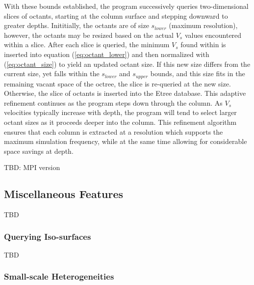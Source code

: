 With these bounds established, the program successively queries two-dimensional slices of octants, starting at the column surface and stepping downward to greater depths. Inititially, the octants are of size $s_{lower}$ (maximum resolution), however, the octants may be resized based on the actual $V_s$ values encountered within a slice. After each slice is queried, the minimum $V_s$ found within is inserted into equation (\ref{eq:octant_lower}) and then normalized with (\ref{eq:octant_size}) to yield an updated octant size. If this new size differs from the current size, yet falls within the $s_{lower}$ and $s_{upper}$ bounds, and this size fits in the remaining vacant space of the octree, the slice is re-queried at the new size. Otherwise, the slice of octants is inserted into the Etree database.
This adaptive refinement continues as the program steps down through the column. As $V_s$ velocities typically increase with depth, the program will tend to select larger octant sizes as it proceeds deeper into the column. This refinement algorithm ensures that each column is extracted at a resolution which supports the maximum simulation frequency, while at the same time allowing for considerable space savings at depth.

TBD: MPI version

\subsection{Miscellaneous Features}

TBD

\subsubsection{Querying Iso-surfaces}

TBD 


\subsubsection{Small-scale Heterogeneities}

